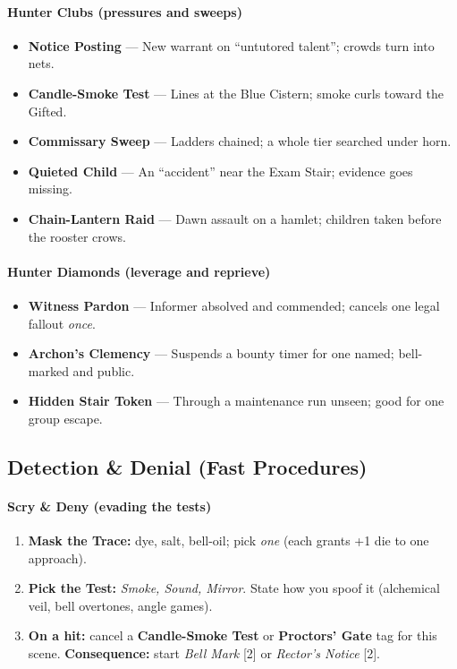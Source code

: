 \paragraph{Hunter Clubs (pressures and sweeps)}
\begin{itemize}
\item \textbf{Notice Posting} --- New warrant on ``untutored talent''; crowds turn into nets.
\item \textbf{Candle-Smoke Test} --- Lines at the Blue Cistern; smoke curls toward the Gifted.
\item \textbf{Commissary Sweep} --- Ladders chained; a whole tier searched under horn.
\item \textbf{Quieted Child} --- An ``accident'' near the Exam Stair; evidence goes missing.
\item \textbf{Chain-Lantern Raid} --- Dawn assault on a hamlet; children taken before the rooster crows.
\end{itemize}

\paragraph{Hunter Diamonds (leverage and reprieve)}
\begin{itemize}
\item \textbf{Witness Pardon} --- Informer absolved and commended; cancels one legal fallout \emph{once}.
\item \textbf{Archon's Clemency} --- Suspends a bounty timer for one named; bell-marked and public.
\item \textbf{Hidden Stair Token} --- Through a maintenance run unseen; good for one group escape.
\end{itemize}

\subsection*{Detection \& Denial (Fast Procedures)}
\label{sec:thepyrgos-detect}
\paragraph{Scry \& Deny (evading the tests)}
\begin{enumerate}
\item \textbf{Mask the Trace:} dye, salt, bell-oil; pick \emph{one} (each grants +1 die to one approach).
\item \textbf{Pick the Test:} \emph{Smoke, Sound, Mirror}. State how you spoof it (alchemical veil, bell overtones, angle games).
\item \textbf{On a hit:} cancel a \textbf{Candle-Smoke Test} or \textbf{Proctors' Gate} tag for this scene. \textbf{Consequence:} start \emph{Bell Mark} [2] or \emph{Rector's Notice} [2].
\end{enumerate}

